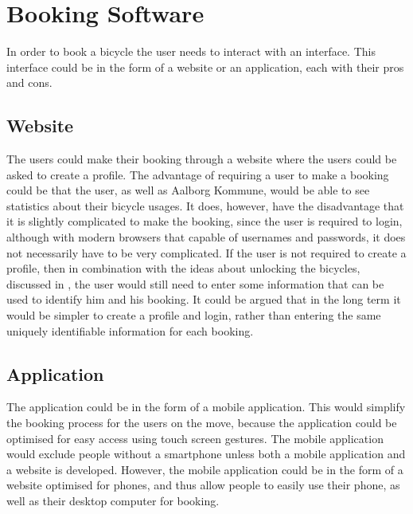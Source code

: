 \section{Booking Software}
In order to book a bicycle the user needs to interact with an interface.
This interface could be in the form of a website or an application, each with their pros and cons.

\subsection{Website}
The users could make their booking through a website where the users could be asked to create a profile.
The advantage of requiring a user to make a booking could be that the user, as well as Aalborg Kommune, would be able to see statistics about their bicycle usages.
It does, however, have the disadvantage that it is slightly complicated to make the booking, since the user is required to login, although with modern browsers that capable of usernames and passwords, it does not necessarily have to be very complicated.
If the user is not required to create a profile, then in combination with the ideas about unlocking the bicycles, discussed in , the user would still need to enter some information that can be used to identify him and his booking.
It could be argued that in the long term it would be simpler to create a profile and login, rather than entering the same uniquely identifiable information for each booking.

\subsection{Application}
The application could be in the form of a mobile application. 
This would simplify the booking process for the users on the move, because the application could be optimised for easy access using touch screen gestures.
The mobile application would exclude people without a smartphone unless both a mobile application and a website is developed.
However, the mobile application could be in the form of a website optimised for phones, and thus allow people to easily use their phone, as well as their desktop computer for booking. 

